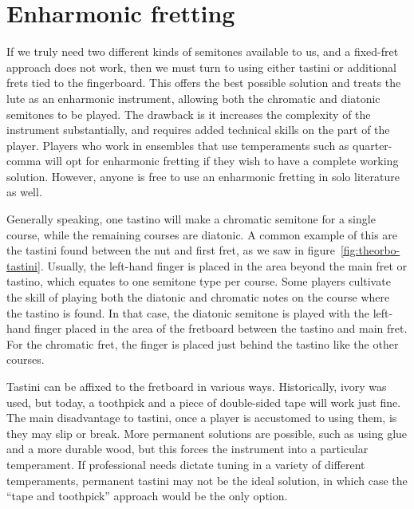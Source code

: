 \section{Enharmonic fretting}

If we truly need two different kinds of semitones available to us, and a fixed-fret
approach does not work, then we must turn to using either tastini or additional frets
tied to the fingerboard.  This offers the best possible solution and treats the lute as
an enharmonic instrument, allowing both the chromatic and diatonic semitones to be
played. The drawback is it increases the complexity of the instrument substantially,
and requires added technical skills on the part of the player. Players who work in
ensembles that use temperaments such as quarter-comma will opt for enharmonic fretting
if they wish to have a complete working solution. However, anyone is free to use an
enharmonic fretting in solo literature as well.

Generally speaking, one tastino will make a chromatic semitone for a single course,
while the remaining courses are diatonic.  A common example of this are the tastini
found between the nut and first fret, as we saw in figure~\ref{fig:theorbo-tastini}.
Usually, the left-hand finger is placed in the area beyond the main fret or tastino,
which equates to one semitone type per course. Some players cultivate the skill of
playing both the diatonic and chromatic notes on the course where the tastino is found.
In that case, the diatonic semitone is played with the left-hand finger placed in the
area of the fretboard between the tastino and main fret.  For the chromatic fret, the
finger is placed just behind the tastino like the other courses.

Tastini can be affixed to the fretboard in various ways. Historically, ivory was used,
but today, a toothpick and a piece of double-sided tape will work just fine.  The main
disadvantage to tastini, once a player is accustomed to using them, is they may
slip or break.  More permanent solutions are possible, such as using glue and a more
durable wood, but this forces the instrument into a particular temperament.  If
professional needs dictate tuning in a variety of different temperaments, permanent
tastini may not be the ideal solution, in which case the ``tape and toothpick''
approach would be the only option.

